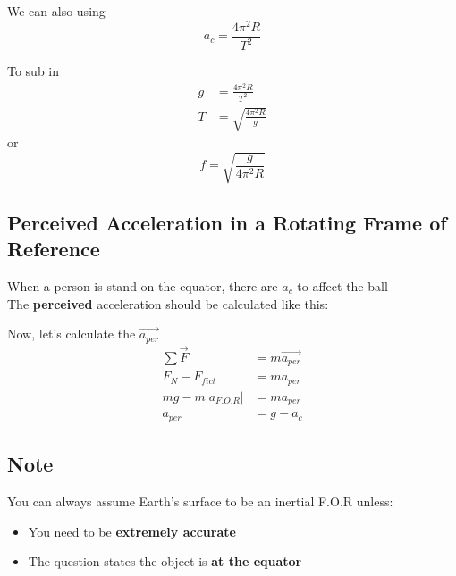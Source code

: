 We can also using
\begin{equation*}
    a_{c} = \frac{4 \pi^2 R}{T^2}
\end{equation*}

To sub in
\begin{align*}
    g &= \frac{4 \pi^2 R}{T^2}\\
    T &= \sqrt{\frac{4 \pi^2 R}{g}}
\end{align*}
or
\begin{equation*}
    f = \sqrt{\frac{g}{4 \pi^2 R}}
\end{equation*}

\subsection{Perceived Acceleration in a Rotating Frame of Reference}
When a person is stand on the equator, there are $a_{c}$ to affect the ball\\

The \textbf{perceived} acceleration should be calculated like this:

\begin{center}
\end{center}

Now, let's calculate the $\vec{a_{per}}$
\begin{align}
    \sum \vec{F} &= m\vec{a_{per}}\\
    F_N - F_{fict} &= ma_{per}\\
    mg - m\left|a_{F.O.R}\right| &= ma_{per}\\
    a_{per} &= g - a_c
\end{align}

\subsection*{Note}
    You can always assume Earth's surface to be an inertial F.O.R unless:
    \begin{itemize}
        \item You need to be \textbf{extremely accurate}
        \item The question states the object is \textbf{at the equator}
    \end{itemize}
